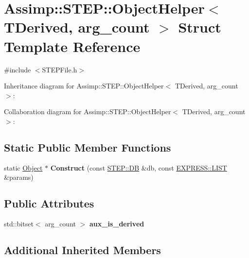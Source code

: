 \hypertarget{struct_assimp_1_1_s_t_e_p_1_1_object_helper}{\section{Assimp\+:\+:S\+T\+E\+P\+:\+:Object\+Helper$<$ T\+Derived, arg\+\_\+count $>$ Struct Template Reference}
\label{struct_assimp_1_1_s_t_e_p_1_1_object_helper}
}


{\ttfamily \#include $<$S\+T\+E\+P\+File.\+h$>$}



Inheritance diagram for Assimp\+:\+:S\+T\+E\+P\+:\+:Object\+Helper$<$ T\+Derived, arg\+\_\+count $>$\+:


Collaboration diagram for Assimp\+:\+:S\+T\+E\+P\+:\+:Object\+Helper$<$ T\+Derived, arg\+\_\+count $>$\+:
\subsection*{Static Public Member Functions}
\begin{DoxyCompactItemize}
\item 
\hypertarget{struct_assimp_1_1_s_t_e_p_1_1_object_helper_ae804c42480247ce42e9cbd09de8aab17}{static \hyperlink{class_assimp_1_1_s_t_e_p_1_1_object}{Object} $\ast$ {\bfseries Construct} (const \hyperlink{class_assimp_1_1_s_t_e_p_1_1_d_b}{S\+T\+E\+P\+::\+D\+B} \&db, const \hyperlink{class_assimp_1_1_s_t_e_p_1_1_e_x_p_r_e_s_s_1_1_l_i_s_t}{E\+X\+P\+R\+E\+S\+S\+::\+L\+I\+S\+T} \&params)}\label{struct_assimp_1_1_s_t_e_p_1_1_object_helper_ae804c42480247ce42e9cbd09de8aab17}

\end{DoxyCompactItemize}
\subsection*{Public Attributes}
\begin{DoxyCompactItemize}
\item 
\hypertarget{struct_assimp_1_1_s_t_e_p_1_1_object_helper_ab06725a4f30a3681ff4f84fe723f4104}{std\+::bitset$<$ arg\+\_\+count $>$ {\bfseries aux\+\_\+is\+\_\+derived}}\label{struct_assimp_1_1_s_t_e_p_1_1_object_helper_ab06725a4f30a3681ff4f84fe723f4104}

\end{DoxyCompactItemize}
\subsection*{Additional Inherited Members}


